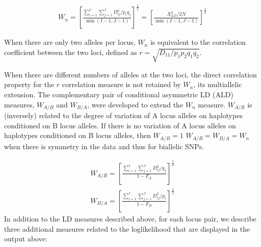 \documentclass[letterpaper,10pt,english,openany,oneside]{sphinxmanual}
\begin{document}
\begin{equation*}
\begin{split}W_n = \left[ {\frac{\sum_{i=1}^{I} {\sum_{j=1}^{J}{D_{ij}^2 / p_i } q_j } }{\min (I - 1,J - 1)}} \right]^{\frac{1}{2}} = \left[ {\frac{X_{LD}^2 / 2N}{\min (I - 1,J - 1)}}\right]^{\frac{1}{2}}\end{split}
\end{equation*}\begin{description}
\sphinxAtStartPar
When there are only two alleles per locus, \(W_n\) is equivalent
to the correlation coefficient between the two loci, defined as
\(r =\sqrt {D_{11} / p_1 p_2 q_1 q_2 }\).

\sphinxAtStartPar
When there are different numbers of alleles at the two loci,
the direct correlation property for the \(r\) correlation
measure is not retained by \(W_n\), its multi\sphinxhyphen{}allelic extension.
The complementary pair of conditional asymmetric LD (ALD) measures,
\(W_{A/B}\) and \(W_{B/A}\), were developed to extend the \(W_n\) measure.
\(W_{A/B}\) is (inversely) related to the
degree of variation of A locus alleles on haplotypes conditioned
on B locus alleles. If there is no variation of A locus alleles
on haplotypes conditioned on B locus alleles, then \(W_{A/B} = 1\)
\(W_{A/B} = W_{B/A} = W_n\) when there is symmetry in the data and
thus for bi\sphinxhyphen{}allelic SNPs.

\end{description}
\begin{equation*}
\begin{split}W_{A/B} = \left[ {\frac{\sum_{i=1}^{I} {\sum_{j=1}^{J}{D_{ij}^2 / q_j } } }{ 1 - F_A }} \right]^{\frac{1}{2}}\end{split}
\end{equation*}\begin{equation*}
\begin{split}W_{B/A} = \left[ {\frac{\sum_{i=1}^{I} {\sum_{j=1}^{J}{D_{ij}^2 / p_i } } }{ 1 - F_B }} \right]^{\frac{1}{2}}\end{split}
\end{equation*}
\sphinxAtStartPar
In addition to the LD measures described above, for each locus pair,
we describe three additional measures related to the log\sphinxhyphen{}likelihood
that are displayed in the output above:
\end{document}
